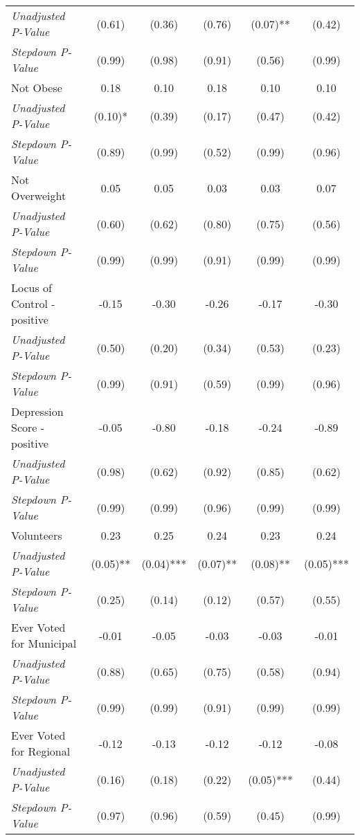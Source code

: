 \begin{tabular}{l c c c c c}
\quad \textit{Unadjusted P-Value} & (0.61) & (0.36) & (0.76) & (0.07)** & (0.42) \\
\quad \textit{Stepdown P-Value} & (0.99) & (0.98) & (0.91) & (0.56) & (0.99) \\
Not Obese & 0.18 & 0.10 & 0.18 & 0.10 & 0.10 \\
\quad \textit{Unadjusted P-Value} & (0.10)* & (0.39) & (0.17) & (0.47) & (0.42) \\
\quad \textit{Stepdown P-Value} & (0.89) & (0.99) & (0.52) & (0.99) & (0.96) \\
Not Overweight & 0.05 & 0.05 & 0.03 & 0.03 & 0.07 \\
\quad \textit{Unadjusted P-Value} & (0.60) & (0.62) & (0.80) & (0.75) & (0.56) \\
\quad \textit{Stepdown P-Value} & (0.99) & (0.99) & (0.91) & (0.99) & (0.99) \\
Locus of Control - positive & -0.15 & -0.30 & -0.26 & -0.17 & -0.30 \\
\quad \textit{Unadjusted P-Value} & (0.50) & (0.20) & (0.34) & (0.53) & (0.23) \\
\quad \textit{Stepdown P-Value} & (0.99) & (0.91) & (0.59) & (0.99) & (0.96) \\
Depression Score - positive & -0.05 & -0.80 & -0.18 & -0.24 & -0.89 \\
\quad \textit{Unadjusted P-Value} & (0.98) & (0.62) & (0.92) & (0.85) & (0.62) \\
\quad \textit{Stepdown P-Value} & (0.99) & (0.99) & (0.96) & (0.99) & (0.99) \\
Volunteers & 0.23 & 0.25 & 0.24 & 0.23 & 0.24 \\
\quad \textit{Unadjusted P-Value} & (0.05)** & (0.04)*** & (0.07)** & (0.08)** & (0.05)*** \\
\quad \textit{Stepdown P-Value} & (0.25) & (0.14) & (0.12) & (0.57) & (0.55) \\
Ever Voted for Municipal & -0.01 & -0.05 & -0.03 & -0.03 & -0.01 \\
\quad \textit{Unadjusted P-Value} & (0.88) & (0.65) & (0.75) & (0.58) & (0.94) \\
\quad \textit{Stepdown P-Value} & (0.99) & (0.99) & (0.91) & (0.99) & (0.99) \\
Ever Voted for Regional & -0.12 & -0.13 & -0.12 & -0.12 & -0.08 \\
\quad \textit{Unadjusted P-Value} & (0.16) & (0.18) & (0.22) & (0.05)*** & (0.44) \\
\quad \textit{Stepdown P-Value} & (0.97) & (0.96) & (0.59) & (0.45) & (0.99) \\

\end{tabular}
